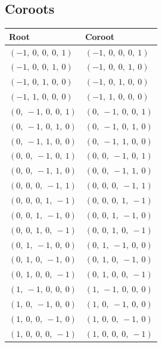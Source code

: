 \documentclass[11pt]{article}
\theoremstyle{definition}
\begin{document}
\subsection{Coroots}

\begin{tabular}{|l|l|}
    \hline
    \textbf{Root} & \textbf{Coroot} \\
    \hline
    $\left( -1, \  0, \  0, \  0, \  1\right)$ & $\left( -1, \  0, \  0, \  0, \  1\right)$ \\
    \hline
    $\left( -1, \  0, \  0, \  1, \  0\right)$ & $\left( -1, \  0, \  0, \  1, \  0\right)$ \\
    \hline
    $\left( -1, \  0, \  1, \  0, \  0\right)$ & $\left( -1, \  0, \  1, \  0, \  0\right)$ \\
    \hline
    $\left( -1, \  1, \  0, \  0, \  0\right)$ & $\left( -1, \  1, \  0, \  0, \  0\right)$ \\
    \hline
    $\left( 0, \  -1, \  0, \  0, \  1\right)$ & $\left( 0, \  -1, \  0, \  0, \  1\right)$ \\
    \hline
    $\left( 0, \  -1, \  0, \  1, \  0\right)$ & $\left( 0, \  -1, \  0, \  1, \  0\right)$ \\
    \hline
    $\left( 0, \  -1, \  1, \  0, \  0\right)$ & $\left( 0, \  -1, \  1, \  0, \  0\right)$ \\
    \hline
    $\left( 0, \  0, \  -1, \  0, \  1\right)$ & $\left( 0, \  0, \  -1, \  0, \  1\right)$ \\
    \hline
    $\left( 0, \  0, \  -1, \  1, \  0\right)$ & $\left( 0, \  0, \  -1, \  1, \  0\right)$ \\
    \hline
    $\left( 0, \  0, \  0, \  -1, \  1\right)$ & $\left( 0, \  0, \  0, \  -1, \  1\right)$ \\
    \hline
    $\left( 0, \  0, \  0, \  1, \  -1\right)$ & $\left( 0, \  0, \  0, \  1, \  -1\right)$ \\
    \hline
    $\left( 0, \  0, \  1, \  -1, \  0\right)$ & $\left( 0, \  0, \  1, \  -1, \  0\right)$ \\
    \hline
    $\left( 0, \  0, \  1, \  0, \  -1\right)$ & $\left( 0, \  0, \  1, \  0, \  -1\right)$ \\
    \hline
    $\left( 0, \  1, \  -1, \  0, \  0\right)$ & $\left( 0, \  1, \  -1, \  0, \  0\right)$ \\
    \hline
    $\left( 0, \  1, \  0, \  -1, \  0\right)$ & $\left( 0, \  1, \  0, \  -1, \  0\right)$ \\
    \hline
    $\left( 0, \  1, \  0, \  0, \  -1\right)$ & $\left( 0, \  1, \  0, \  0, \  -1\right)$ \\
    \hline
    $\left( 1, \  -1, \  0, \  0, \  0\right)$ & $\left( 1, \  -1, \  0, \  0, \  0\right)$ \\
    \hline
    $\left( 1, \  0, \  -1, \  0, \  0\right)$ & $\left( 1, \  0, \  -1, \  0, \  0\right)$ \\
    \hline
    $\left( 1, \  0, \  0, \  -1, \  0\right)$ & $\left( 1, \  0, \  0, \  -1, \  0\right)$ \\
    \hline
    $\left( 1, \  0, \  0, \  0, \  -1\right)$ & $\left( 1, \  0, \  0, \  0, \  -1\right)$ \\
    \hline
\end{tabular}
\end{document}
